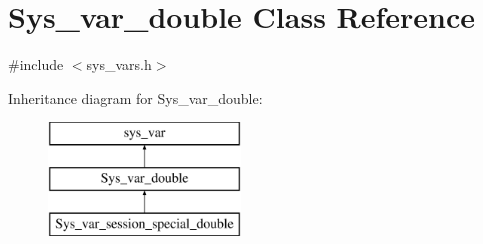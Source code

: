 \hypertarget{classSys__var__double}{}\section{Sys\+\_\+var\+\_\+double Class Reference}
\label{classSys__var__double}


{\ttfamily \#include $<$sys\+\_\+vars.\+h$>$}

Inheritance diagram for Sys\+\_\+var\+\_\+double\+:\begin{figure}[H]
\begin{center}
\leavevmode
\includegraphics[height=3.000000cm]{classSys__var__double}
\end{center}
\end{figure}
